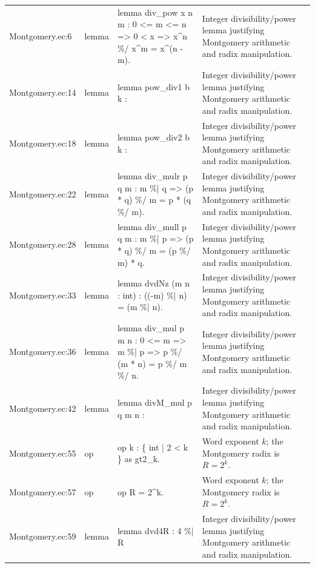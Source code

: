\documentclass[10pt]{article}
\begin{document}
\begin{longtable}{L{0.11\textwidth}L{0.05\textwidth}L{0.38\textwidth}L{0.42\textwidth}}
Montgomery.\allowbreak{}ec:\allowbreak{}6 & lemma & {\ttfamily\scriptsize lemma div\_pow x n m : 0 <= m <= n => 0 < x => x\textasciicircum{}n \%/ x\textasciicircum{}m = x\textasciicircum{}(n - m).} & Integer divisibility/power lemma justifying Montgomery arithmetic and radix manipulation. \\
Montgomery.\allowbreak{}ec:\allowbreak{}14 & lemma & {\ttfamily\scriptsize lemma pow\_div1 b k :} & Integer divisibility/power lemma justifying Montgomery arithmetic and radix manipulation. \\
Montgomery.\allowbreak{}ec:\allowbreak{}18 & lemma & {\ttfamily\scriptsize lemma pow\_div2 b k :} & Integer divisibility/power lemma justifying Montgomery arithmetic and radix manipulation. \\
Montgomery.\allowbreak{}ec:\allowbreak{}22 & lemma & {\ttfamily\scriptsize lemma div\_mulr p q m : m \%| q => (p * q) \%/ m = p * (q \%/ m).} & Integer divisibility/power lemma justifying Montgomery arithmetic and radix manipulation. \\
Montgomery.\allowbreak{}ec:\allowbreak{}28 & lemma & {\ttfamily\scriptsize lemma div\_mull p q m : m \%| p => (p * q) \%/ m = (p \%/ m) * q.} & Integer divisibility/power lemma justifying Montgomery arithmetic and radix manipulation. \\
Montgomery.\allowbreak{}ec:\allowbreak{}33 & lemma & {\ttfamily\scriptsize lemma dvdNz (m n : int) : ((-m) \%| n) = (m \%| n).} & Integer divisibility/power lemma justifying Montgomery arithmetic and radix manipulation. \\
Montgomery.\allowbreak{}ec:\allowbreak{}36 & lemma & {\ttfamily\scriptsize lemma div\_mul p m n : 0 <= m => m \%| p => p \%/ (m * n) = p \%/ m \%/ n.} & Integer divisibility/power lemma justifying Montgomery arithmetic and radix manipulation. \\
Montgomery.\allowbreak{}ec:\allowbreak{}42 & lemma & {\ttfamily\scriptsize lemma divM\_mul p q m n :} & Integer divisibility/power lemma justifying Montgomery arithmetic and radix manipulation. \\
Montgomery.\allowbreak{}ec:\allowbreak{}55 & op & {\ttfamily\scriptsize op k : \{ int | 2 < k \} as gt2\_k.} & Word exponent $k$; the Montgomery radix is $R=2^k$. \\
Montgomery.\allowbreak{}ec:\allowbreak{}57 & op & {\ttfamily\scriptsize op R = 2\textasciicircum{}k.} & Word exponent $k$; the Montgomery radix is $R=2^k$. \\
Montgomery.\allowbreak{}ec:\allowbreak{}59 & lemma & {\ttfamily\scriptsize lemma dvd4R : 4 \%| R} & Integer divisibility/power lemma justifying Montgomery arithmetic and radix manipulation. \\

\end{longtable}
\end{document}
